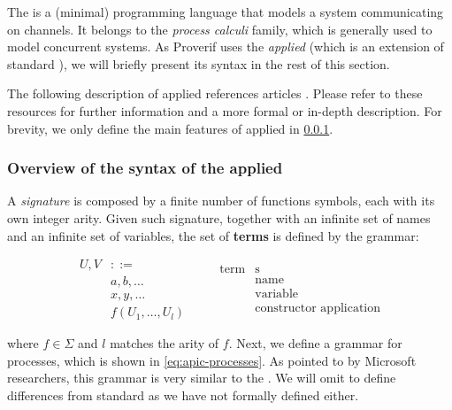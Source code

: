 The \pic \cite{pi-calculus-book} is a (minimal) programming language that models a system communicating on channels. It belongs to the \textit{process calculi} family, which is generally used to model concurrent systems. As Proverif uses the \textit{applied} \pic (which is an extension of standard \picnospace), we will briefly present its syntax in the rest of this section.

The following description of applied \pic references articles \cite{applied-pi-calculus-private-auth, applied-pi-calculus-abadi-1, applied-pi-calculus-abadi-2}. Please refer to these resources for further information and a more formal or in-depth description. For brevity, we only define the main features of applied \pic in \cref{subsub:syntax-apic}.

\subsubsection{Overview of the syntax of the applied \pic}
\label{subsub:syntax-apic}

A \textit{signature \textSigma} is composed by a finite number of functions symbols, each with its own integer arity. Given such signature, together with an infinite set of names and an infinite set of variables, the set of \textbf{terms} is defined by the grammar:

\begin{equation}
  \label{eq:apic-terms}
  \begin{aligned}
    U, V & ::=                           \\
         & a, b, \dots                   \\
         & x, y, \dots                   \\
         & f\left(U_1, \dots, U_l\right)
  \end{aligned}
  \qquad
  \begin{aligned}
    \mbox{term} & \mbox{s}                       \\
                & \mbox{name}                    \\
                & \mbox{variable}                \\
                & \mbox{constructor application}
  \end{aligned}
\end{equation}

where $f \in \Sigma$ and $l$ matches the arity of $f$. Next, we define a grammar for processes, which is shown in \cref{eq:apic-processes}. As pointed to by Microsoft researchers, this grammar is very similar to the \pic \cite{applied-pi-calculus-private-auth}. We will omit to define differences from standard \pic as we have not formally defined \pic either.

